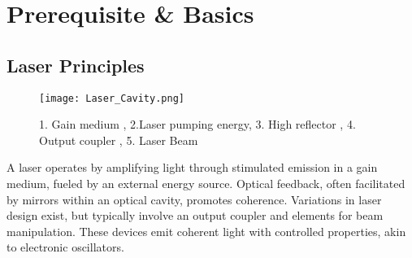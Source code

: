 \section{Prerequisite \& Basics}
\label{sec:voraussetzungen-grundlagen}

\subsection{Laser Principles}
    \begin{wrapfigure}[16]{r}[0cm]{0.4\textwidth}
        \centering
        \vspace{-\normalbaselineskip}
        \texttt{[image: Laser\_Cavity.png]}
        \vspace{-10pt}
        \caption{ 1. Gain medium , 2.Laser pumping energy, 3. High reflector , 4. Output coupler , 5. Laser Beam  \cite{Laser_cav} }
        
        \label{fig:lasercav}
    \end{wrapfigure}
    
    A laser operates by amplifying light through stimulated emission in a gain medium, fueled by an external energy source. 
    Optical feedback, often facilitated by mirrors within an optical cavity, promotes coherence. 
    Variations in laser design exist, but typically involve an output coupler and elements for beam manipulation. 
    These devices emit coherent light with controlled properties, akin to electronic oscillators. \\
